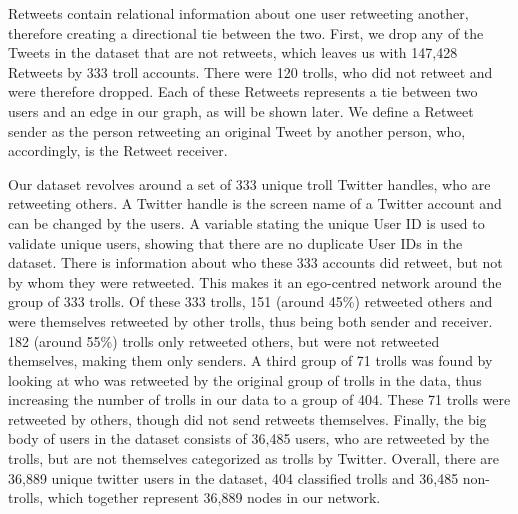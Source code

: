 \documentclass[12pt, titlepage=true, toc=bib]{scrartcl}
\begin{document}
Retweets contain relational information about one user retweeting another, therefore creating a directional tie between the two. First, we drop any of the Tweets in the dataset that are not retweets, which leaves us with 147,428 Retweets by 333 troll accounts. There were 120 trolls, who did not retweet and were therefore dropped. Each of these Retweets represents a tie between two users and an edge in our graph, as will be shown later. We define a Retweet sender as the person retweeting an original Tweet by another person, who, accordingly, is the Retweet receiver.
 
Our dataset revolves around a set of 333 unique troll Twitter handles, who are retweeting others. A Twitter handle is the screen name of a Twitter account and can be changed by the users. A variable stating the unique User ID is used to validate unique users, showing that there are no duplicate User IDs in the dataset. There is information about who these 333 accounts did retweet, but not by whom they were retweeted. This makes it an ego-centred network around the group of 333 trolls. Of these 333 trolls, 151 (around 45\%) retweeted others and were themselves retweeted by other trolls, thus being both sender and receiver. 182 (around 55\%) trolls only retweeted others, but were not retweeted themselves, making them only senders. A third group of 71 trolls was found by looking at who was retweeted by the original group of trolls in the data, thus increasing the number of trolls in our data to a group of 404. These 71 trolls were retweeted by others, though did not send retweets themselves. Finally, the big body of users in the dataset consists of 36,485 users, who are retweeted by the trolls, but are not themselves categorized as trolls by Twitter. Overall, there are 36,889 unique twitter users in the dataset, 404 classified trolls and 36,485 non-trolls, which together represent 36,889 nodes in our network.
\end{document}
